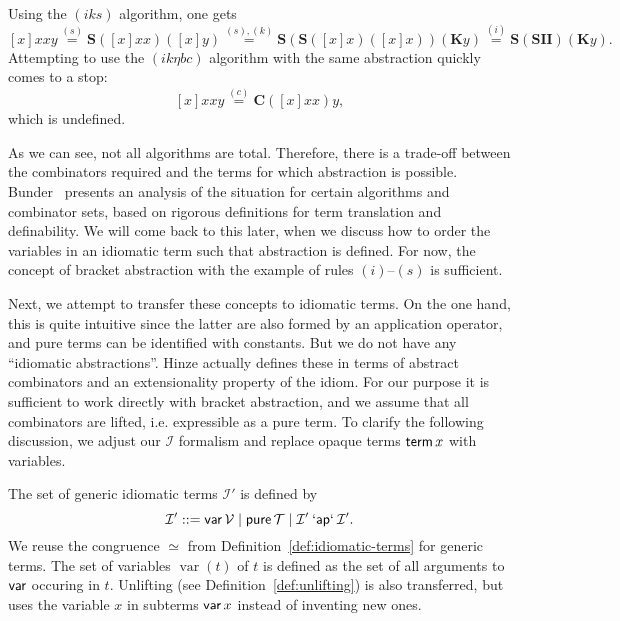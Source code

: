 \begin{example}\label{exmp:bracket-abs}
Using the $(iks)$ algorithm, one gets
\[ [x]xxy \stackrel{(s)}{=} \mathbf{S}([x]xx)([x]y)
	\stackrel{(s),(k)}{=} \mathbf{S}(\mathbf{S}([x]x)([x]x))(\mathbf{K}y)
	\stackrel{(i)}{=} \mathbf{S}(\mathbf{SII})(\mathbf{K}y). \]
Attempting to use the $(ik\eta bc)$ algorithm with the same abstraction
quickly comes to a stop:
\[ [x]xxy \stackrel{(c)}{=} \mathbf{C}([x]xx)y, \]
which is undefined.
\end{example}

As we can see, not all algorithms are total.
Therefore, there is a trade-off between the combinators required and the terms
for which abstraction is possible.
Bunder~\cite{bunder96} presents an analysis of the situation for certain
algorithms and combinator sets, based on rigorous definitions for term
translation and definability.
We will come back to this later, when we discuss how to order the variables in
an idiomatic term such that abstraction is defined.
For now, the concept of bracket abstraction with the example of rules
$(i)$--$(s)$ is sufficient.

Next, we attempt to transfer these concepts to idiomatic terms.
On the one hand, this is quite intuitive since the latter are also formed by
an application operator, and pure terms can be identified with constants.
But we do not have any ``idiomatic abstractions''.
Hinze actually defines these in terms of abstract combinators and an
extensionality property of the idiom.
For our purpose it is sufficient to work directly with bracket abstraction,
and we assume that all combinators are lifted, i.e. expressible as a pure term.
To clarify the following discussion, we adjust our $\mathcal{I}$ formalism
and replace opaque terms $\operatorname{\mathsf{term}} x$ with variables.

\begin{definition}
The set of generic idiomatic terms $\mathcal{I}'$ is defined by
\begin{equation}
	\mathcal{I}' ::= \operatorname{\mathsf{var}} \mathcal{V} \mid \operatorname{\mathsf{pure}} \mathcal{T} \mid
		\mathcal{I}' \mathbin{\mathsf{`ap`}} \mathcal{I}'.
\end{equation}
We reuse the congruence $\simeq$ from Definition~\ref{def:idiomatic-terms} for
generic terms.
The set of variables $\operatorname{var}(t)$ of $t$ is defined as the set of
all arguments to $\operatorname{\mathsf{var}}$ occuring in $t$.
Unlifting (see Definition~\ref{def:unlifting}) is also transferred, but uses
the variable $x$ in subterms $\operatorname{\mathsf{var}} x$ instead of inventing new ones.
\end{definition}

